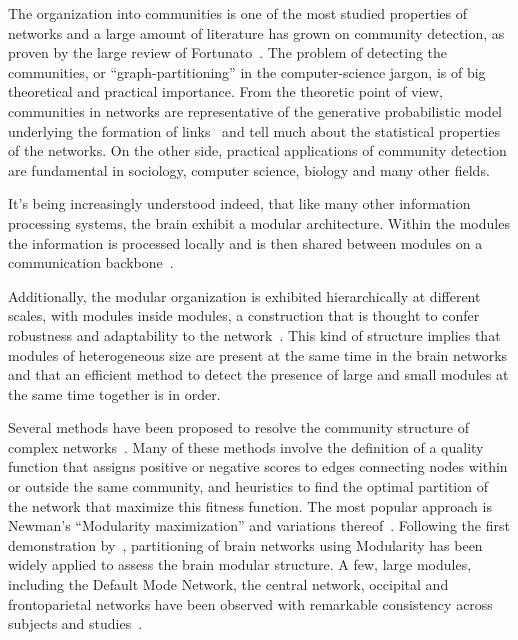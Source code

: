 The organization into communities is one of the most studied properties of networks and a large amount of literature has grown on community detection, as proven by the large review of Fortunato~\cite{fortunato2010}.
The problem of detecting the communities, or ``graph-partitioning'' in the computer-science jargon, is of big theoretical and practical importance.
From the theoretic point of view, communities in networks are representative of the generative probabilistic model underlying the formation of links~\cite{Karrer2011} and tell much about the statistical properties of the networks.
On the other side, practical applications of community detection are fundamental in sociology, computer science, biology and many other fields.

It's being increasingly understood indeed, that like many other information processing systems, the brain exhibit a modular architecture.
Within the modules the information is processed locally and is then shared between modules on a communication backbone~\cite{DeReus2013a,VandenHeuvel2013a}.

Additionally, the modular organization is exhibited hierarchically at different scales, with modules inside modules, a construction that is thought to confer robustness and adaptability to the network~\cite{meunier2010}. This kind of structure implies that modules of heterogeneous size are present at the same time in the brain networks and that an efficient method to detect the presence of large and small modules at the same time together is in order.

Several methods have been proposed to resolve the community structure of complex networks~\cite{fortunato2010,lancichinetti2009}.
Many of these methods involve the definition of a quality function that assigns positive or negative scores to edges connecting nodes within or outside the same community, and heuristics to find the optimal partition of the network that maximize this fitness function. The most popular approach is Newman's ``Modularity maximization'' and variations thereof~\cite{newman2006}.
Following the first demonstration by~\cite{schwarz2008}, partitioning of brain networks using Modularity has been widely applied to assess the brain modular structure.
A few, large modules, including the Default Mode Network, the central network, occipital and frontoparietal networks have been observed with remarkable consistency across subjects and studies~\cite{meunier2010,wang2010}. 


